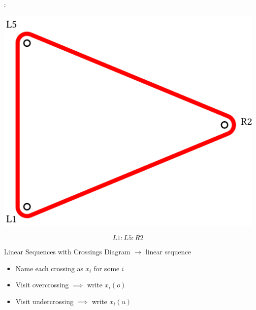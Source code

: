 \begin{frame}{\secname: \subsecname}
\begin{center}
    \includegraphics[width=0.7\columnwidth]{figures/open.png}
\end{center}
$$L1:L5:R2$$
\end{frame}

\begin{frame}[t]{Linear Sequences with Crossings}
Diagram $\to$ linear sequence
\begin{itemize}[<+(1)->]
    \item Name each crossing as $x_i$ for some $i$
    \item Visit overcrossing $\implies$ write $x_i(o)$
    \item Visit undercrossing $\implies$ write $x_i(u)$
\end{itemize}

\end{frame}




